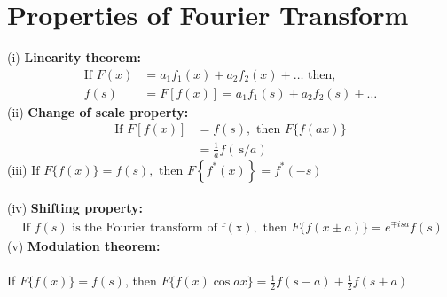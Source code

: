 \section{Properties of Fourier Transform}
(i) \textbf{Linearity theorem:} 
\begin{align*}
\text{If }F(x)&=a_{1} f_{1}(x)+a_{2} f_{2}(x)+\ldots\text{ then, }\\f(s)&=F[f(x)]=a_{1} f_{1}(s)+a_{2} f_{2}(s)+\ldots
\end{align*}
(ii) \textbf{Change of scale property: }
\begin{align*}
\text{If }F[f(x)]&=f(s),\text{ then }F\{f(a x)\}\\&=\frac{1}{a} f(\mathrm{~s} / a)
\end{align*}
(iii) $\text{If }F\{f(x)\}=f(s),\text{ then }F\left\{f^{*}(x)\right\}=f^{*}(-s)$\\\\
(iv) \textbf{Shifting property:}
 \begin{align*}
\text{ If $f(s)$ is the Fourier transform of }\mathrm{f}(\mathrm{x}), \text{ then }F\{f(x \pm a)\}=e^{\mp i s a} f(s)
 \end{align*}
(v) \textbf{Modulation theorem:} \\\\
If $F\{f(x)\}=f(s)$, then $F\{f(x) \cos a x\}=\frac{1}{2} f(s-a)+\frac{1}{2} f(s+a)$
